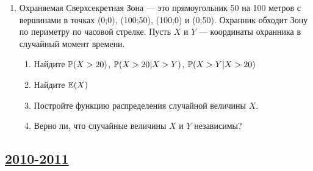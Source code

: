 \begin{enumerate}
\item Охраняемая Сверхсекретная Зона — это прямоугольник 50 на 100 метров с вершинами
в точках (0;0), (100;50), (100;0) и (0;50).  Охранник обходит Зону по периметру
по часовой стрелке. Пусть $X$ и $Y$ — координаты охранника в случайный момент времени.
\begin{enumerate}
\item Найдите $\P(X>20)$, $\P(X>20|X>Y)$, $\P(X>Y|X>20)$
\item Найдите $\E(X)$ %
\item Постройте функцию распределения случайной величины $X$.
\item Верно ли, что случайные величины $X$ и $Y$ независимы?
\end{enumerate}


\end{enumerate}



\newpage
\subsection[2010-2011]{\hyperref[sec:sol_kr_01_2010_2011]{2010-2011}}
\label{sec:kr_01_2010_2011}


